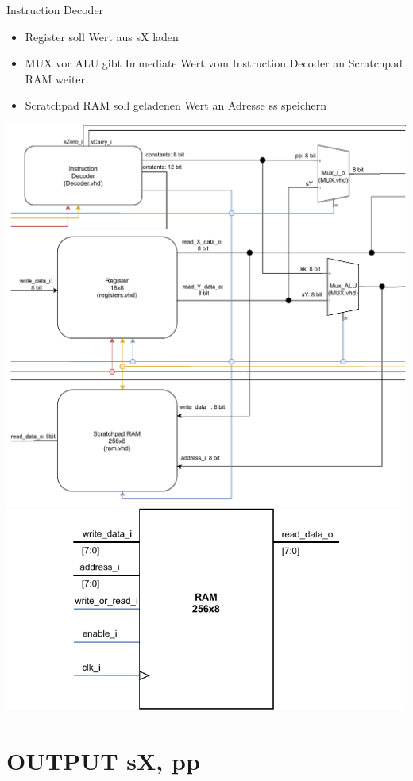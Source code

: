 \documentclass[10pt, t,
aspectratio=169,%
usenames,
dvipsnames,
]{beamer}
\begin{document}
	\begin{frame}{Instruction Decoder}	
		\begin{itemize}
			\item Register soll Wert aus sX laden
			\item MUX vor ALU gibt Immediate Wert vom Instruction Decoder an Scratchpad RAM weiter
			\item Scratchpad RAM soll geladenen Wert an Adresse ss speichern
		\end{itemize}
		\begin{multicols}{2}	
		\includegraphics[width=.7\linewidth]{../Blockbeschreibungen/RAM-BlockdiagramSnipits.pdf}
		\includegraphics[width=\linewidth]{../Blockbeschreibungen/RAM_beschreibung.pdf}
		\end{multicols}
	\end{frame}

	\section{OUTPUT sX, pp}
	
\end{document}
